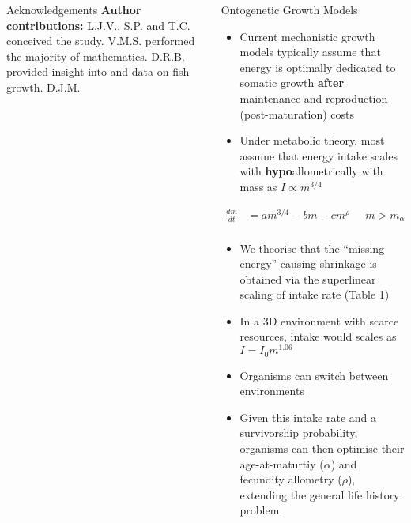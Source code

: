 \documentclass[xcolor={table}]{beamer}
\begin{document}
\begin{frame}[fragile=singleslide,t]
\begin{columns}[onlytextwidth,T]
\begin{column}{.47\textwidth}
\begin{block}{Acknowledgements}
    \textbf{Author contributions:} L.J.V., S.P. and T.C. conceived the study. V.M.S. performed the majority of mathematics. D.R.B. provided insight into and data on fish growth. D.J.M. 
\end{block}

\end{column}


\begin{column}{.47\textwidth}

\begin{block}{Ontogenetic Growth Models}
    \begin{itemize}
        \item Current mechanistic growth models typically assume that energy is optimally dedicated to somatic growth \textbf{after} maintenance and reproduction (post-maturation) costs
        \item Under metabolic theory, most assume that energy intake scales with \textbf{hypo}allometrically with mass as $I \propto m^{3/4}$ \autocite{West2001}
    \end{itemize}
    \begin{align*}
        \frac{dm}{dt} &= am^{3/4} - bm - cm^{\rho} \; \; \; \;\; m > m_{\alpha} \\
    \end{align*}
    \begin{itemize}
        \item We theorise that the ``missing energy'' causing shrinkage is obtained via the superlinear scaling of intake rate (Table 1)
        \item In a 3D environment with scarce resources, intake would scales as $I = I_{0}m^{1.06}$
        \item Organisms can switch between environments 
        \item Given this intake rate and a survivorship probability, organisms can then optimise their age-at-maturtiy ($\alpha$) and fecundity allometry ($\rho$), extending the general life history problem
    \end{itemize}
\end{block}


\end{column}
\end{columns}
\end{frame}
\end{document}
